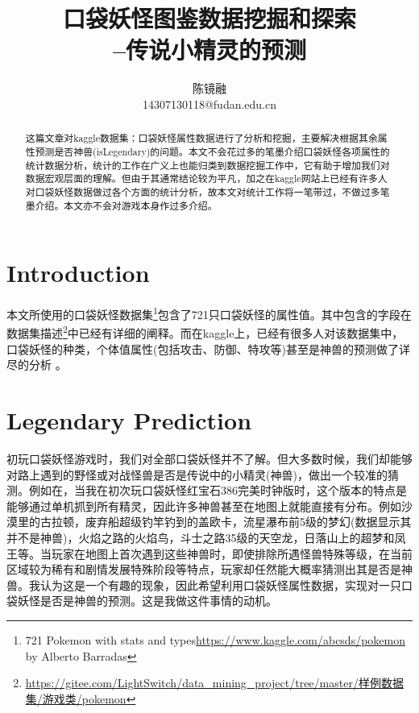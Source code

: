 \documentclass[a4paper, cs4size, oneside]{article}
\title{口袋妖怪图鉴数据挖掘和探索 \\
--传说小精灵的预测}
\author{陈镜融 \\ 14307130118@fudan.edu.cn}
\begin{document}
\maketitle

\renewcommand{\abstractname}{摘要}

\begin{abstract}

这篇文章对kaggle数据集：口袋妖怪属性数据进行了分析和挖掘，主要解决根据其余属性预测是否神兽(isLegendary)的问题。本文不会花过多的笔墨介绍口袋妖怪各项属性的统计数据分析，统计的工作在广义上也能归类到数据挖掘工作中，它有助于增加我们对数据宏观层面的理解。但由于其通常结论较为平凡，加之在kaggle网站上已经有许多人对口袋妖怪数据做过各个方面的统计分析，故本文对统计工作将一笔带过，不做过多笔墨介绍。本文亦不会对游戏本身作过多介绍。

\end{abstract}


\section{Introduction}
本文所使用的口袋妖怪数据集\footnote{721 Pokemon with stats and types\url{https://www.kaggle.com/abcsds/pokemon} by Alberto Barradas}包含了721只口袋妖怪的属性值。其中包含的字段在数据集描述\footnote{\url{https://gitee.com/LightSwitch/data_mining_project/tree/master/样例数据集/游戏类/pokemon}}中已经有详细的阐释。而在kaggle上，已经有很多人对该数据集中，口袋妖怪的种类，个体值属性(包括攻击、防御、特攻等)甚至是神兽的预测做了详尽的分析\cite{visofpoketype} \cite{pokeanalysis} \cite{worldofpokemon} \cite{explepoketypes} \cite{predictlegendary}。

\section{Legendary Prediction}
初玩口袋妖怪游戏时，我们对全部口袋妖怪并不了解。但大多数时候，我们却能够对路上遇到的野怪或对战怪兽是否是传说中的小精灵(神兽)，做出一个较准的猜测。例如在，当我在初次玩口袋妖怪红宝石386完美时钟版时，这个版本的特点是能够通过单机抓到所有精灵，因此许多神兽甚至在地图上就能直接有分布。例如沙漠里的古拉顿，废弃船超级钓竿钓到的盖欧卡，流星瀑布前5级的梦幻(数据显示其并不是神兽)，火焰之路的火焰鸟，斗士之路35级的天空龙，日落山上的超梦和凤王等。当玩家在地图上首次遇到这些神兽时，即使排除所遇怪兽特殊等级，在当前区域较为稀有和剧情发展特殊阶段等特点，玩家却任然能大概率猜测出其是否是神兽。我认为这是一个有趣的现象，因此希望利用口袋妖怪属性数据，实现对一只口袋妖怪是否是神兽的预测。这是我做这件事情的动机。
\end{document}
